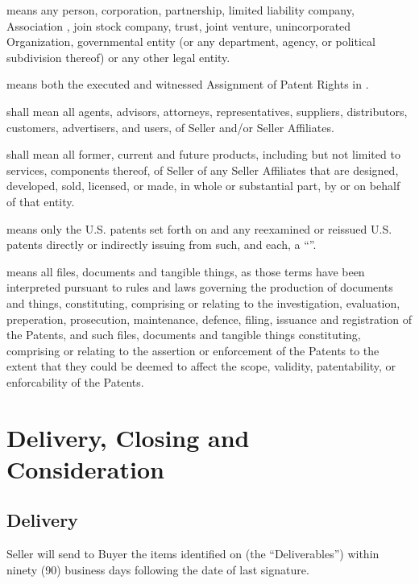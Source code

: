 \documentclass[letterpaper,10pt,english]{sphinxmanual}
\begin{document}
 means any person, corporation, partnership, limited liability company, Association , join stock company, trust, joint venture, unincorporated Organization, governmental entity (or any department, agency, or political subdivision thereof) or any other legal entity.

 means both the executed and witnessed Assignment of Patent Rights in .

 shall mean all agents, advisors, attorneys, representatives, suppliers, distributors, customers, advertisers, and users, of Seller and/or Seller Affiliates.

 shall mean all former, current and future products, including but not limited to services, components thereof, of Seller of any Seller Affiliates that are designed, developed, sold, licensed, or made, in whole or substantial part, by or on behalf of that entity.

 means only the U.S. patents set forth on  and any reexamined or reissued U.S. patents directly or indirectly issuing from such, and each, a “”.

 means all files, documents and tangible things, as those terms have been interpreted pursuant to rules and laws governing the production of documents and things, constituting, comprising or relating to the investigation, evaluation, preperation, prosecution, maintenance, defence, filing, issuance and registration of the Patents, and such files, documents and tangible things constituting, comprising or relating to the assertion or enforcement of the Patents to the extent that they could be deemed to affect the scope, validity, patentability, or enforcability of the Patents.


\section{Delivery, Closing and Consideration}
\label{\detokenize{2-delivery:delivery-closing-and-consideration}}\label{\detokenize{2-delivery::doc}}

\subsection{Delivery}
\label{\detokenize{2-delivery:delivery}}
Seller will send to Buyer the items identified on  (the “Deliverables”) within ninety (90) business days following the date of last signature.
\end{document}
